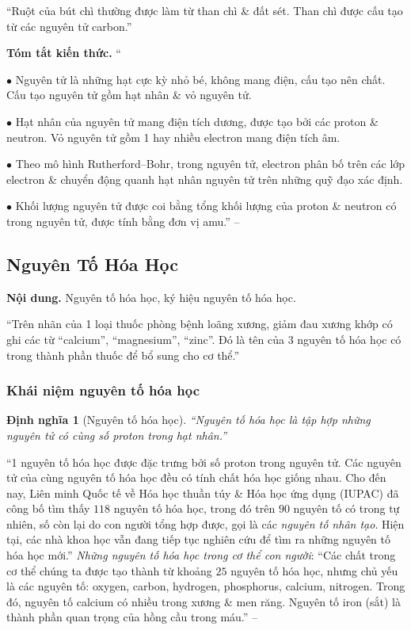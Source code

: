\documentclass{article}
\numberwithin{equation}{section}
\newtheorem{dinhnghia}{Định nghĩa}[section]
\begin{document}
``Ruột của bút chì thường được làm từ than chì \& đất sét. Than chì được cấu tạo từ các nguyên tử carbon.''
\vspace{2mm}

\noindent\textbf{Tóm tắt kiến thức.}
``\begin{enumerate*}
	\item[$\bullet$] Nguyên tử là những hạt cực kỳ nhỏ bé, không mang điện, cấu tạo nên chất. Cấu tạo nguyên tử gồm hạt nhân \& vỏ nguyên tử.
	\item[$\bullet$] Hạt nhân của nguyên tử mang điện tích dương, được tạo bởi các proton \& neutron. Vỏ nguyên tử gồm 1 hay nhiều electron mang điện tích âm.
	\item[$\bullet$] Theo mô hình Rutherford--Bohr, trong nguyên tử, electron phân bố trên các lớp electron \& chuyển động quanh hạt nhân nguyên tử trên những quỹ đạo xác định.
	\item[$\bullet$] Khối lượng nguyên tử được coi bằng tổng khối lượng của proton \& neutron có trong nguyên tử, được tính bằng đơn vị amu.'' -- \cite[p. 14]{SGK_KHTN_7_Canh_Dieu}
\end{enumerate*}


\subsection{Nguyên Tố Hóa Học}
\textsf{\textbf{Nội dung.} Nguyên tố hóa học, ký hiệu nguyên tố hóa học.}

``Trên nhãn của 1 loại thuốc phòng bệnh loãng xương, giảm đau xương khớp có ghi các từ ``calcium'', ``magnesium'', ``zinc''. Đó là tên của 3 nguyên tố hóa học có trong thành phần thuốc để bổ sung cho cơ thể.''

\subsubsection{Khái niệm nguyên tố hóa học}

\begin{dinhnghia}[Nguyên tố hóa học]
	``\emph{Nguyên tố hóa học} là tập hợp những nguyên tử có cùng số proton trong hạt nhân.''
\end{dinhnghia}
``1 nguyên tố hóa học được đặc trưng bởi số proton trong nguyên tử. Các nguyên tử của cùng nguyên tố hóa học đều có tính chất hóa học giống nhau. Cho đến nay, Liên minh Quốc tế về Hóa học thuần túy \& Hóa học ứng dụng (IUPAC) đã công bố tìm thấy $118$ nguyên tố hóa học, trong đó trên $90$ nguyên tố có trong tự nhiên, số còn lại do con người tổng hợp được, gọi là các \textit{nguyên tố nhân tạo}. Hiện tại, các nhà khoa học vẫn đang tiếp tục nghiên cứu để tìm ra những nguyên tố hóa học mới.'' \textit{Những nguyên tố hóa học trong cơ thể con người}: ``Các chất trong cơ thể chúng ta được tạo thành từ khoảng $25$ nguyên tố hóa học, nhưng chủ yếu là các nguyên tố: oxygen, carbon, hydrogen, phosphorus, calcium, nitrogen. Trong đó, nguyên tố calcium có nhiều trong xương \& men răng. Nguyên tố iron (sắt) là thành phần quan trọng của hồng cầu trong máu.'' -- \cite[p. 15]{SGK_KHTN_7_Canh_Dieu}
\end{document}

